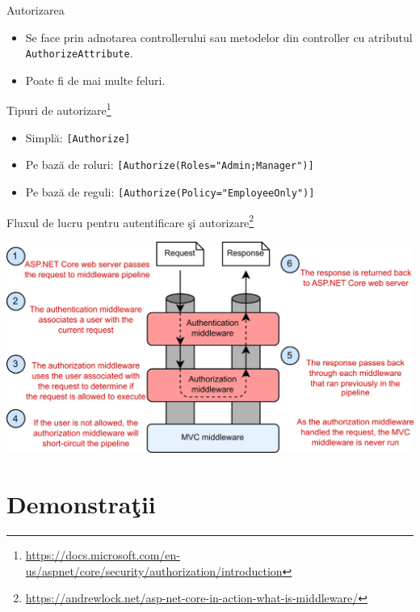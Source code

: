 \documentclass[presentation]{beamer}
\begin{document}
\begin{frame}[label={sec:org56f0f0d},fragile]{Autorizarea}
 \begin{itemize}
\item Se face prin adnotarea controllerului sau metodelor din controller cu atributul \texttt{AuthorizeAttribute}.
\item Poate fi de mai multe feluri.
\end{itemize}
\end{frame}
\begin{frame}[label={sec:org326e910},fragile]{Tipuri de autorizare\footnote{\url{https://docs.microsoft.com/en-us/aspnet/core/security/authorization/introduction}}}
 \begin{itemize}
\item Simplă: \texttt{[Authorize]}
\item Pe bază de roluri: \texttt{[Authorize(Roles="Admin;Manager")]}
\item Pe bază de reguli: \texttt{[Authorize(Policy="EmployeeOnly")]}
\end{itemize}
\end{frame}
\begin{frame}[label={sec:org70bbac1}]{Fluxul de lucru pentru autentificare şi autorizare\footnote{\url{https://andrewlock.net/asp-net-core-in-action-what-is-middleware/}}}
\begin{center}
\includegraphics[width=\textwidth]{img/auth.png}
\end{center}
\end{frame}
\section{Demonstraţii}
\label{sec:org9833dda}
\end{document}
